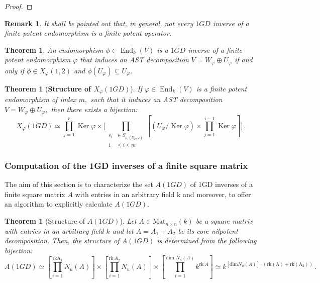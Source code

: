 \documentclass[10pt,a4paper]{amsart}
\newtheorem{thm}[defn]{Theorem}
\theoremstyle{plain}
\newtheorem{rem}[defn]{Remark}
\theoremstyle{remark}
\numberwithin{equation}{section} \numberwithin{defn}{section}
\newcommand\ed{\operatorname{End}}
\newcommand\Ker{\operatorname{Ker}}
\newcommand{\f}{\varphi}
\begin{document}
\begin{proof}
\end{proof}

\begin{rem}
It shall be pointed out that, in general, not every $1GD$ inverse of a finite potent endomorphism is a finite potent operator.
\end{rem}

\begin{thm}\label{T: Charact 1GD AST e inva}
An endomorphism $\phi \in \ed_k(V)$ is a $1GD$ inverse of a finite potent endomorphism $\f$ that induces an AST decomposition $V=W_{\f}\oplus U_{\f}$ if and only if $\phi \in X_{\f}(1,2)$ and $\phi(U_{\f})\subseteq U_{\f}.$
\end{thm}


\begin{thm}[\textbf{Structure of $X_{\f}(1GD)$}]\label{T: Estructura1GD}
If $\f\in \ed_k(V)$ is a finite potent endomorphism of index $m,$ such that it induces an AST decomposition $V=W_{\f}\oplus U_{\f},$ then there exists a bijection: \begin{equation} X_\varphi (1GD) \simeq \prod_{j= 1}^{r} \Ker \varphi \times \big [\underset {\begin{aligned} s_i &\in S_{{\mu}_i (U_\varphi, \varphi)} \\ 1 &\leq i \leq m \end{aligned}} {\prod} [(U_{\f}/\Ker \varphi) \times \prod_{j= 1}^{i-1} \Ker \varphi] \big ]\, .\end{equation}
\end{thm}


\subsubsection{Computation of the 1GD inverses of a finite square matrix}\label{ss: Computation 1GD Matrices}

The aim of this section is to characterize the set $A(1GD)$ of 1GD inverses of a finite square matrix $A$ with entries in an arbitrary field k and moreover, to offer an algorithm to explicitly calculate $A(1GD).$
 

\begin{thm} [Structure of $A(1GD)$] \label{T: Char A1GD fin} Let $A \in \text{Mat}_{n\times n} (k)$ be a square matrix with entries in an arbitrary field $k$ and let $A = A_1 + A_2$ be its core-nilpotent decomposition. Then, the structure of $A(1GD)$ is determined from the following bijection:
\begin{equation} \label{eq:char A1GD} A(1GD) \simeq [\prod_{i=1}^{\mathrm{rk A_1}} N_u(A)]\times  [\prod_{i=1}^{\text{rk} \, A_2} N_u(A)] \times [\prod_{i=1}^{\text{dim } N_u(A)} k^{\text{rk} \, A}]\simeq k^{[\mathrm{dim }N_u(A)]\cdot (\mathrm{rk (A)}+\mathrm{rk (A_2)}) }  \, . \end{equation}
\end{thm}
\end{document}
